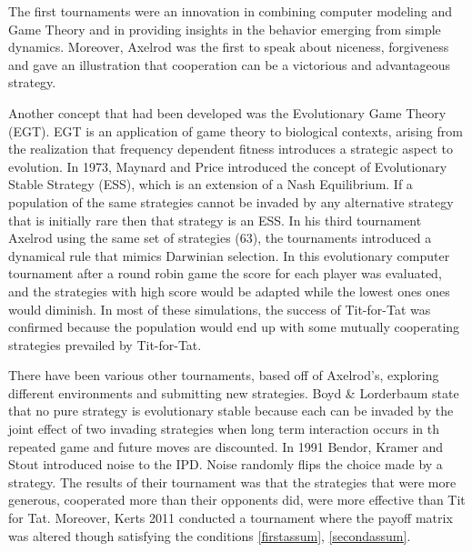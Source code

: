 The first tournaments were an innovation in combining computer modeling and Game
Theory and in providing insights in the behavior emerging from simple dynamics.
Moreover, Axelrod was the first to speak about niceness, forgiveness and gave an
illustration that cooperation can be a victorious and advantageous strategy.

Another concept that had been developed was the Evolutionary Game Theory (EGT).
EGT is an application of game theory to biological contexts, arising from the
realization that frequency dependent fitness introduces a strategic aspect to
evolution. In 1973, Maynard and Price introduced the concept of Evolutionary
Stable Strategy (ESS), which is an extension of a Nash Equilibrium. If a
population of the same strategies cannot be invaded by any alternative strategy
that is initially rare then that strategy is an ESS. In his third tournament
Axelrod \cite{Axelrod1981} using the same set of strategies (63),
the tournaments introduced a dynamical rule that mimics Darwinian selection.
In this evolutionary computer tournament after a round robin game the score for
each player was evaluated, and the strategies with high score would be adapted
while the lowest ones ones would diminish. In most of these simulations, the
success of Tit-for-Tat was confirmed because the population would end up with
some mutually cooperating strategies prevailed by Tit-for-Tat.

There have been various other tournaments, based off of Axelrod’s, exploring different
environments and submitting new strategies. Boyd \& Lorderbaum \cite{Lorberbaum1994}
state that no pure
strategy is evolutionary stable because each can be invaded by the joint effect
of two invading strategies when long term interaction occurs in th repeated game
and future moves are discounted. In 1991 Bendor, Kramer and Stout \cite{The2016}
introduced noise to the IPD. Noise randomly flips the choice made by a
strategy. The results of their tournament was that the strategies that were more
generous, cooperated more than their opponents did, were more effective than Tit
for Tat. Moreover, Kerts 2011 conducted a tournament where the payoff matrix was
altered though satisfying the conditions \ref{firstassum}, \ref{secondassum}.


